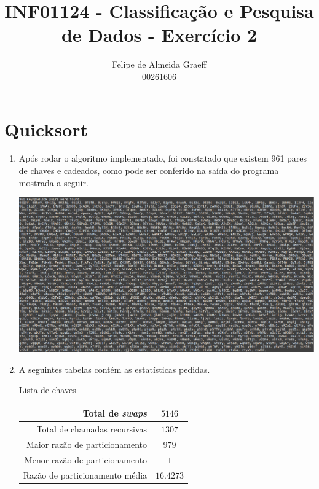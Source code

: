\documentclass[10pt,a4paper]{article}
\begin{document}
	\title{INF01124 - Classificação e Pesquisa de Dados - Exercício 2}
	\date{}
	\author{Felipe de Almeida Graeff\\00261606}
	\maketitle

	\section{Quicksort}

		\begin{enumerate}

			\item Após rodar o algoritmo implementado, foi constatado que existem
      961 pares de chaves e cadeados, como pode ser conferido na saída do
      programa mostrada a seguir.

      \includegraphics[width=\textwidth]{keys.png}

			\item A seguintes tabelas contém as estatísticas pedidas.

        {\large Lista de chaves}

        \begin{tabular}{ r | c }
          Total de \emph{swaps}           & $5146$    \\  \hline
          Total de chamadas recursivas    & $1307$    \\  \hline
          Maior razão de particionamento  & $979$     \\  \hline
          Menor razão de particionamento  & $1$       \\  \hline
          Razão de particionamento média  & $16.4273$ \\
        \end{tabular}



\end{enumerate}
\end{document}
